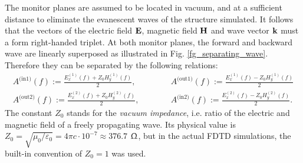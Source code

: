The monitor planes are assumed to be located in vacuum, and at a sufficient distance to eliminate the evanescent waves of the structure simulated. It follows that the vectors of the electric field $\mathbf{E}$, magnetic field $\mathbf{H}$ and wave vector ${\mathbf{k}}$ must a form right-handed triplet. %
At both monitor planes, the forward and backward wave are linearly superposed as illustrated in Fig. \ref{fg_separating_wave}. Therefore they can be separated by the following relations: 
\begin{equation} 
	\begin{split}
		A^{\text{(in1)}}(f)  := \frac{E_{x}^{(1)}(f) + Z_0 H_{y}^{(1)}(f)}{2}, \quad \quad \quad & A^{\text{(out1)}}(f) := \frac{E_{x}^{(1)}(f) - Z_0 H_{y}^{(1)}(f)}{2}\\
		A^{\text{(out2)}}(f) := \frac{E_{x}^{(2)}(f) + Z_0 H_{y}^{(2)}(f)}{2}, \quad \quad \quad & A^{\text{(in2)}}(f)  := \frac{E_{x}^{(2)}(f) - Z_0 H_{y}^{(2)}(f)}{2}. 
	\end{split} 
\label{eq_separate_ampli}\end{equation}
The constant $Z_0$ stands for the \textit{vacuum impedance}, i.e. ratio of the electric and magnetic field of a freely propagating wave. Its physical value is $Z_0 = \sqrt{\mu_0/\varepsilon_0} = 4\pi c \cdot 10^{-7} \approx 376.7$ $\Upomega$, but in the actual FDTD simulations, the built-in convention of $Z_0 = 1$ was used.

